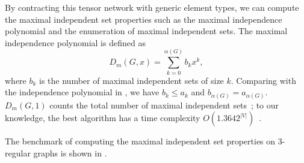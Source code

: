 \documentclass[review, onefignum, onetabnum]{siamart190516}
\begin{document}
By contracting this tensor network with generic element types,
we can compute the maximal independent set properties such as the maximal independence polynomial and the enumeration of maximal independent sets.
The maximal independence polynomial is defined as
\begin{equation}
D_{m}(G, x) = \sum_{k=0}^{\alpha(G)} b_k x^k,
\end{equation}
where $b_k$ is the number of maximal independent sets of size $k$.
Comparing with the independence polynomial in , we have $b_{k} \leq a_{k}$ and $b_{\alpha(G)} = a_{\alpha(G)}$. $D_m(G, 1)$ counts the total number of maximal independent sets~\cite{Gaspers2012, Manne2013};
to our knowledge, the best algorithm has a time complexity $O(1.3642^{|V|})$~\cite{Gaspers2012}.

The benchmark of computing the maximal independent set properties on $3$-regular graphs is shown in .
\end{document}
